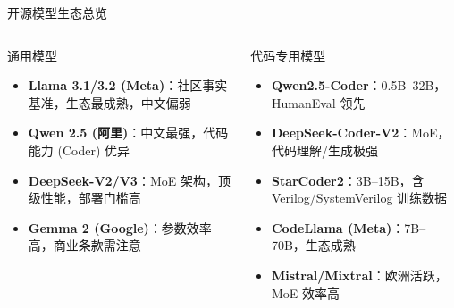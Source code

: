 \documentclass[UTF8,11pt,aspectratio=169]{beamer}
\begin{document}
\begin{frame}{开源模型生态总览}
  \begin{columns}[T]
    \begin{block}{通用模型}
      \begin{itemize}
        \item \textbf{Llama 3.1/3.2 (Meta)}：社区事实基准，生态最成熟，中文偏弱
        \item \textbf{Qwen 2.5 (阿里)}：中文最强，代码能力 (Coder) 优异
        \item \textbf{DeepSeek-V2/V3}：MoE 架构，顶级性能，部署门槛高
        \item \textbf{Gemma 2 (Google)}：参数效率高，商业条款需注意
      \end{itemize}
    \end{block}

    \begin{block}{代码专用模型}
      \begin{itemize}
        \item \textbf{Qwen2.5-Coder}：0.5B--32B，HumanEval 领先
        \item \textbf{DeepSeek-Coder-V2}：MoE，代码理解/生成极强
        \item \textbf{StarCoder2}：3B--15B，含 Verilog/SystemVerilog 训练数据
        \item \textbf{CodeLlama (Meta)}：7B--70B，生态成熟
        \item \textbf{Mistral/Mixtral}：欧洲活跃，MoE 效率高
      \end{itemize}
    \end{block}
  \end{columns}
\end{frame}
\end{document}
